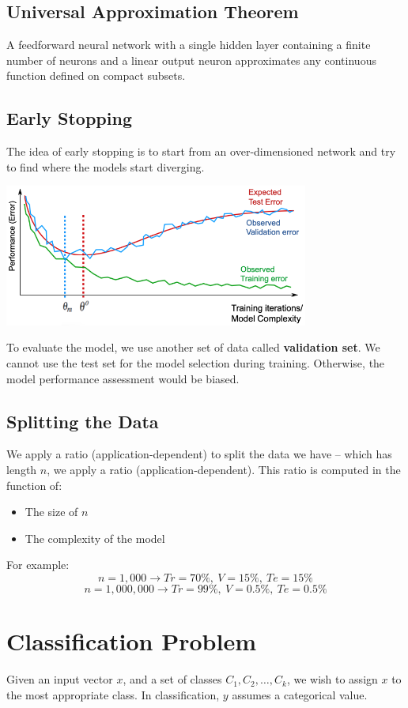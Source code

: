 \documentclass{article}
\begin{document}
\subsection{Universal Approximation Theorem}
A feedforward neural network with a single hidden layer containing a finite number of neurons and a linear output neuron approximates any continuous function defined on compact subsets.

\subsection{Early Stopping}
The idea of early stopping is to start from an over-dimensioned network and try to find where the models start diverging.

\begin{center}
	\includegraphics[width=10cm]{early_stopping.png}
\end{center}
To evaluate the model, we use another set of data called \textbf{validation set}. We cannot use the test set for the model selection during training. Otherwise, the model performance assessment would be biased.

\subsection{Splitting the Data}
We apply a ratio (application-dependent) to split the data we have -- which has length $n$, we apply a ratio (application-dependent). This ratio is computed in the function of:

\begin{itemize}
	\item The size of $n$
	\item The complexity of the model
\end{itemize}
For example:
\[ n = 1,000 \rightarrow Tr = 70\%,~ V = 15\%,~ Te = 15\% \]
\[ n = 1,000,000 \rightarrow Tr = 99\%,~ V = 0.5\%,~ Te = 0.5\% \]

\section{Classification Problem}
Given an input vector $x$, and a set of classes $C_1, C_2, \dots, C_k$, we wish to assign $x$ to the most appropriate class. In classification, $y$ assumes a categorical value.
\end{document}
